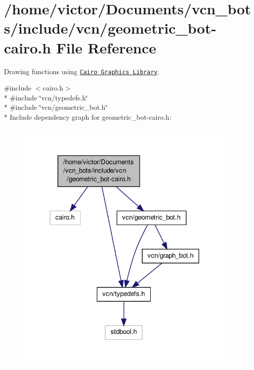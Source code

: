 \hypertarget{geometric__bot-cairo_8h}{\section{/home/victor/\+Documents/vcn\+\_\+bots/include/vcn/geometric\+\_\+bot-\/cairo.h File Reference}
\label{geometric__bot-cairo_8h}
}


Drawing functions using \href{http://www.cairographics.org}{\tt Cairo Graphics Library}.  


{\ttfamily \#include $<$cairo.\+h$>$}\\*
{\ttfamily \#include \char`\"{}vcn/typedefs.\+h\char`\"{}}\\*
{\ttfamily \#include \char`\"{}vcn/geometric\+\_\+bot.\+h\char`\"{}}\\*
Include dependency graph for geometric\+\_\+bot-\/cairo.h\+:
\nopagebreak
\begin{figure}[H]
\begin{center}
\leavevmode
\includegraphics[width=306pt]{geometric__bot-cairo_8h__incl}
\end{center}
\end{figure}
